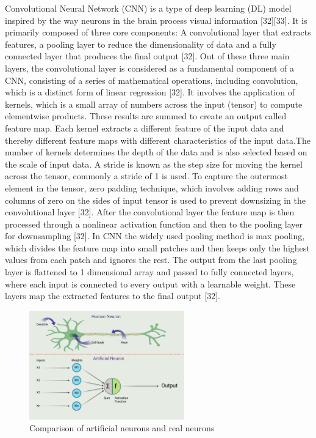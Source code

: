 \documentclass[12pt,a4paper]{report}
\begin{document}
Convolutional Neural Network (CNN) is a type of deep learning (DL) model inspired by the way neurons in the brain process visual information [32][33]. It is primarily composed of three core components: A convolutional layer that extracts features, a pooling layer to reduce the 
dimensionality of data and a fully connected layer that produces the final output [32]. Out of these three main layers, the convolutional layer is considered as a fundamental component of a CNN, consisting of a series of mathematical operations, including convolution, which is 
a distinct form of linear regression [32]. It involves the application of kernels, which is a small array of numbers across the input (tensor) to compute elementwise products. These results are summed to create an output called feature map. Each kernel extracts a different feature 
of the input data and thereby different feature maps with different characteristics of the input data.The number of kernels determines the depth of the data and is also selected based on the scale of input data. A stride is known as the step size for moving the kernel across the tensor, 
commonly a stride of 1 is used. To capture the outermost element in the tensor, zero padding technique, which involves adding rows and columns of zero on the sides of input tensor is used to prevent downsizing in the convolutional layer [32]. After the convolutional layer the feature map 
is then processed through a nonlinear activation function and then to the pooling layer for downsampling [32]. In CNN the widely used pooling method is max pooling, which divides the feature map into small patches and then keeps only the highest values from each patch and ignores the rest. 
The output from the last pooling layer is flattened to 1 dimensional array and passed to fully connected layers, where each input is connected to every output with a learnable weight. These layers map the extracted features to the final output [32]. \\

\begin{figure}[h]
    \centering
    \includegraphics[width=0.6\textwidth]{images/neuron2.png}
    \caption{Comparison of artificial neurons and real neurons}
    \label{Figure 4}
\end{figure}
\end{document}
